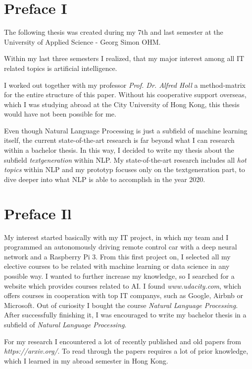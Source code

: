 \thispagestyle{empty}
\section*{Preface I}
\label{sec:prolog_1}

The following thesis was created during my 7th and last semester at the University of Applied Science - Georg Simon OHM. 

Within my last three semesters I realized, that my major interest among all IT related topics is artificial intelligence.

I worked out together with my professor \textit{Prof. Dr. Alfred Holl} a method-matrix for the entire structure of this paper. Without his cooperative support overseas, which I was studying abroad at the City University of Hong Kong, this thesis would have not been possible for me.

Even though Natural Language Processing is just a subfield of machine learning itself, the current state-of-the-art research is far beyond what I can research within a bachelor thesis. In this way, I decided to write my thesis about the subfield \textit{textgeneration} within NLP. My state-of-the-art research includes all \textit{hot topics} within NLP and my prototyp focuses only on the textgeneration part, to dive deeper into what NLP is able to accomplish in the year 2020.

\newpage

\section*{Preface Il}
\label{sec:prolog_2}

My interest started basically with my IT project, in which my team and I programmed an autonomously driving remote control car with a deep neural network and a Raspberry Pi 3. From this first project on, I selected all my elective courses to be related with machine learning or data science in any possible way. I wanted to further increase my knowledge, so I searched for a website which provides courses related to AI. I found \textit{www.udacity.com}, which offers courses  in cooperation with top IT companys, such as Google, Airbnb or Microsoft. Out of curiosity I bought the course \textit{Natural Language Processing}. After successfully finishing it, I was encouraged to write my bachelor thesis in a subfield of \textit{Natural Language Processing}. 

For my research I encountered a lot of recently published and old papers from \textit{https://arxiv.org/}. To read through the papers requires a lot of prior knowledge, which I learned in my abroad semester in Hong Kong. 

